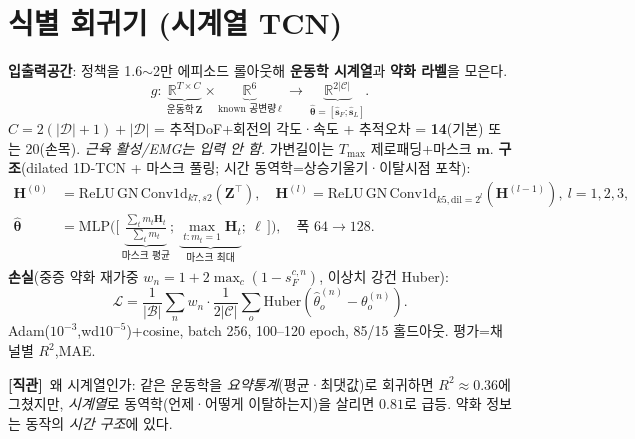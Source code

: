 \documentclass[11pt]{article}
\renewcommand{\vec}[1]{\mathbf{#1}}
\newcommand{\R}{\mathbb{R}}
\newcommand{\Cset}{\mathcal{C}}\newcommand{\Dset}{\mathcal{D}}
\newcommand{\intuition}[1]{\par\smallskip\noindent\textbf{[직관]}\ #1\par\smallskip}
\begin{document}
\section{식별 회귀기 (시계열 TCN)}
\textbf{입출력공간}: 정책을 1.6$\sim$2만 에피소드 롤아웃해 \textbf{운동학 시계열}과 \textbf{약화 라벨}을 모은다.
\begin{equation}
g:\ \underbrace{\R^{T\times C}}_{\text{운동학}\,\vec Z}\times\underbrace{\R^{6}}_{\text{known 공변량}\,\boldsymbol\ell}\ \longrightarrow\ \underbrace{\R^{2|\Cset|}}_{\widehat{\boldsymbol\theta}=[\hat{\vec s}_F;\hat{\vec s}_L]}.
\end{equation}
$C=2(|\Dset|{+}1)+|\Dset|$ = 추적DoF+회전의 각도·속도 + 추적오차 = \textbf{14}(기본) 또는 20(손목). \emph{근육 활성/EMG는 입력 안 함.} 가변길이는 $T_{\max}$ 제로패딩+마스크 $\vec m$.
\textbf{구조}(dilated 1D-TCN + 마스크 풀링; 시간 동역학=상승기울기·이탈시점 포착):
\begin{align}
\vec H^{(0)}&=\mathrm{ReLU}\,\mathrm{GN}\,\mathrm{Conv1d}_{k7,s2}(\vec Z^\top),\quad
\vec H^{(l)}=\mathrm{ReLU}\,\mathrm{GN}\,\mathrm{Conv1d}_{k5,\mathrm{dil}=2^l}(\vec H^{(l-1)}),\ l{=}1,2,3,\\
\widehat{\boldsymbol\theta}&=\mathrm{MLP}\Big(\big[\,\underbrace{\tfrac{\sum_t m_t\vec H_t}{\sum_t m_t}}_{\text{마스크 평균}};\ \underbrace{\max_{t:m_t=1}\vec H_t}_{\text{마스크 최대}};\ \boldsymbol\ell\,\big]\Big),\quad \text{폭 }64{\to}128.
\end{align}
\textbf{손실}(중증 약화 재가중 $w_n{=}1{+}2\max_c(1{-}s_F^{c,n})$, 이상치 강건 Huber):
\begin{equation}
\mathcal L=\frac1{|\mathcal B|}\sum_{n}w_n\cdot\frac1{2|\Cset|}\sum_o\mathrm{Huber}(\hat\theta^{(n)}_o-\theta^{(n)}_o).
\end{equation}
Adam($10^{-3}$,wd$10^{-5}$)+cosine, batch 256, 100--120 epoch, 85/15 홀드아웃. 평가=채널별 $R^2$,MAE.
\intuition{왜 시계열인가: 같은 운동학을 \emph{요약통계}(평균·최댓값)로 회귀하면 $R^2{\approx}0.36$에 그쳤지만, \emph{시계열}로 동역학(언제·어떻게 이탈하는지)을 살리면 $0.81$로 급등. 약화 정보는 동작의 \emph{시간 구조}에 있다.}
\end{document}
